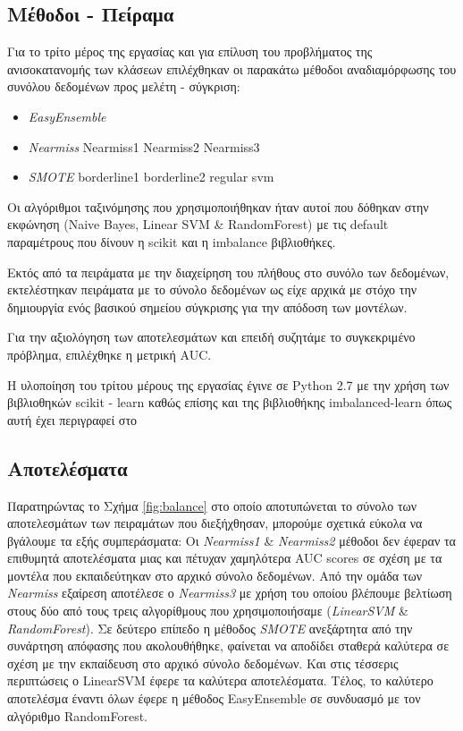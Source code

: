 \subsection{Μέθοδοι - Πείραμα}

Για το τρίτο μέρος της εργασίας και για επίλυση του προβλήματος της ανισοκατανομής των κλάσεων επιλέχθηκαν οι παρακάτω μέθοδοι αναδιαμόρφωσης του συνόλου δεδομένων προς μελέτη - σύγκριση:

\begin{itemize}
	\item \emph{EasyEnsemble}
	\item \emph{Nearmiss}
		\subitem Nearmiss1
		\subitem Nearmiss2
		\subitem Nearmiss3

	\item \emph{SMOTE}
		\subitem borderline1
		\subitem borderline2
		\subitem regular
		\subitem svm
\end{itemize}

Οι αλγόριθμοι ταξινόμησης που χρησιμοποιήθηκαν ήταν αυτοί που δόθηκαν στην εκφώνηση (Naive Bayes, Linear SVM \& RandomForest) με τις default παραμέτρους που δίνουν η scikit και η imbalance βιβλιοθήκες.

Εκτός από τα πειράματα με την διαχείρηση του πλήθους στο συνόλο των δεδομένων, εκτελέστηκαν πειράματα με το σύνολο δεδομένων ως είχε αρχικά με στόχο την δημιουργία ενός βασικού σημείου σύγκρισης για την απόδοση των μοντέλων. 

Για την αξιολόγηση των αποτελεσμάτων και επειδή συζητάμε το συγκεκριμένο πρόβλημα, επιλέχθηκε η μετρική AUC.

Η υλοποίηση του τρίτου μέρους της εργασίας έγινε σε Python 2.7 με την χρήση των βιβλιοθηκών scikit - learn \cite{scikit-learn} καθώς επίσης και της βιβλιοθήκης imbalanced-learn όπως αυτή έχει περιγραφεί στο \citeauthor{JMLR:v18:16-365}


\subsection{Αποτελέσματα}

Παρατηρώντας το Σχήμα \ref{fig:balance} στο οποίο αποτυπώνεται το σύνολο των αποτελεσμάτων των πειραμάτων που διεξήχθησαν, μπορούμε σχετικά εύκολα να βγάλουμε τα εξής συμπεράσματα: Οι \emph{Nearmiss1} \& \emph{Nearmiss2} μέθοδοι δεν έφεραν τα επιθυμητά αποτελέσματα μιας και πέτυχαν χαμηλότερα AUC scores σε σχέση με τα μοντέλα που εκπαιδεύτηκαν στο αρχικό σύνολο δεδομένων. Από την ομάδα των \emph{Nearmiss} εξαίρεση αποτέλεσε ο \emph{Nearmiss3} με χρήση του οποίου βλέπουμε βελτίωση στους δύο από τους τρεις αλγορίθμους που χρησιμοποιήσαμε (\emph{LinearSVM} \& \emph{RandomForest}). Σε δεύτερο επίπεδο η μέθοδος \emph{SMOTE} ανεξάρτητα από την συνάρτηση απόφασης που ακολουθήθηκε, φαίνεται να αποδίδει σταθερά καλύτερα σε σχέση με την εκπαίδευση στο αρχικό σύνολο δεδομένων. Και στις τέσσερις περιπτώσεις ο LinearSVM έφερε τα καλύτερα αποτελέσματα. Τέλος, το καλύτερο αποτελέσμα έναντι όλων έφερε η μέθοδος EasyEnsemble σε συνδυασμό με τον αλγόριθμο RandomForest.

